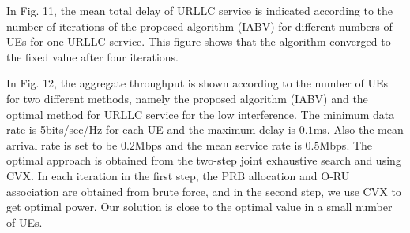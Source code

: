 \documentclass[lettersize,journal]{IEEEtran}
\begin{document}
In Fig. 11, the mean total delay of URLLC service is indicated according to the number of iterations of the
proposed algorithm (IABV) for different numbers of UEs for one URLLC service. This figure shows that the algorithm converged to the fixed value after four iterations.

In Fig. 12, the aggregate throughput is shown according to the number of UEs for two different methods, namely the
proposed algorithm (IABV) and the optimal method for URLLC service for the low interference.
The minimum data rate is 5bits/sec/Hz for each UE and the maximum delay is $0.1$ms.
Also the mean arrival rate is set to be $0.2$Mbps and the mean service rate is $0.5$Mbps.
The optimal approach is obtained from the two-step joint exhaustive search and using CVX.
In each iteration in the first step, the PRB allocation and O-RU association are obtained from brute force, and in the second step, we use CVX to get optimal power.
Our solution is close to the optimal value in a small number of UEs.
\end{document}
